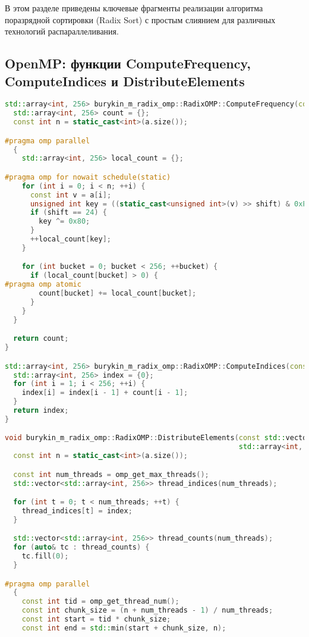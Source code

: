 \documentclass[12pt]{article}
\begin{document}
В этом разделе приведены ключевые фрагменты реализации алгоритма поразрядной сортировки (Radix Sort) с простым слиянием для различных технологий распараллеливания.

\subsection*{OpenMP: функции ComputeFrequency, ComputeIndices и DistributeElements}
\begin{lstlisting}[language=C++]
std::array<int, 256> burykin_m_radix_omp::RadixOMP::ComputeFrequency(const std::vector<int>& a, const int shift) {
  std::array<int, 256> count = {};
  const int n = static_cast<int>(a.size());

#pragma omp parallel
  {
    std::array<int, 256> local_count = {};

#pragma omp for nowait schedule(static)
    for (int i = 0; i < n; ++i) {
      const int v = a[i];
      unsigned int key = ((static_cast<unsigned int>(v) >> shift) & 0xFFU);
      if (shift == 24) {
        key ^= 0x80;
      }
      ++local_count[key];
    }

    for (int bucket = 0; bucket < 256; ++bucket) {
      if (local_count[bucket] > 0) {
#pragma omp atomic
        count[bucket] += local_count[bucket];
      }
    }
  }

  return count;
}

std::array<int, 256> burykin_m_radix_omp::RadixOMP::ComputeIndices(const std::array<int, 256>& count) {
  std::array<int, 256> index = {0};
  for (int i = 1; i < 256; ++i) {
    index[i] = index[i - 1] + count[i - 1];
  }
  return index;
}

void burykin_m_radix_omp::RadixOMP::DistributeElements(const std::vector<int>& a, std::vector<int>& b,
                                                       std::array<int, 256> index, const int shift) {
  const int n = static_cast<int>(a.size());

  const int num_threads = omp_get_max_threads();
  std::vector<std::array<int, 256>> thread_indices(num_threads);

  for (int t = 0; t < num_threads; ++t) {
    thread_indices[t] = index;
  }

  std::vector<std::array<int, 256>> thread_counts(num_threads);
  for (auto& tc : thread_counts) {
    tc.fill(0);
  }

#pragma omp parallel
  {
    const int tid = omp_get_thread_num();
    const int chunk_size = (n + num_threads - 1) / num_threads;
    const int start = tid * chunk_size;
    const int end = std::min(start + chunk_size, n);


\end{lstlisting}
\end{document}
